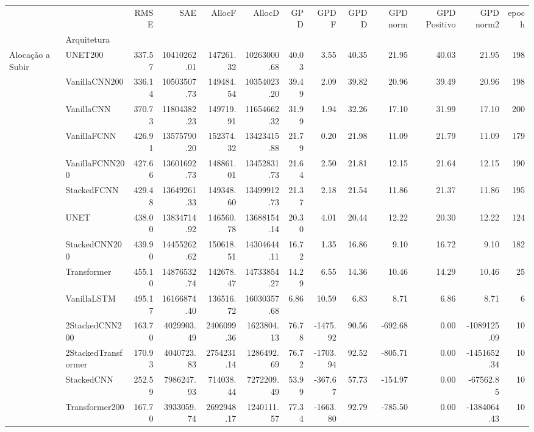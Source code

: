 \begin{tabular}{llrrrrrrrrrrr}
\toprule
 &  & RMSE & SAE & AllocF & AllocD & GPD & GPD F & GPD D & GPD norm & GPD Positivo & GPD norm2 & epoch \\
 & Arquitetura &  &  &  &  &  &  &  &  &  &  &  \\
\midrule
\multirow[t]{14}{*}{Alocação a Subir} & UNET200 & 337.57 & 10410262.01 & 147261.32 & 10263000.68 & 40.03 & 3.55 & 40.35 & 21.95 & 40.03 & 21.95 & 198 \\
 & VanillaCNN200 & 336.14 & 10503507.73 & 149484.54 & 10354023.20 & 39.49 & 2.09 & 39.82 & 20.96 & 39.49 & 20.96 & 198 \\
 & VanillaCNN & 370.73 & 11804382.23 & 149719.91 & 11654662.32 & 31.99 & 1.94 & 32.26 & 17.10 & 31.99 & 17.10 & 200 \\
 & VanillaFCNN & 426.91 & 13575790.20 & 152374.32 & 13423415.88 & 21.79 & 0.20 & 21.98 & 11.09 & 21.79 & 11.09 & 179 \\
 & VanillaFCNN200 & 427.66 & 13601692.73 & 148861.01 & 13452831.73 & 21.64 & 2.50 & 21.81 & 12.15 & 21.64 & 12.15 & 190 \\
 & StackedFCNN & 429.48 & 13649261.33 & 149348.60 & 13499912.73 & 21.37 & 2.18 & 21.54 & 11.86 & 21.37 & 11.86 & 195 \\
 & UNET & 438.00 & 13834714.92 & 146560.78 & 13688154.14 & 20.30 & 4.01 & 20.44 & 12.22 & 20.30 & 12.22 & 124 \\
 & StackedCNN200 & 439.90 & 14455262.62 & 150618.51 & 14304644.11 & 16.72 & 1.35 & 16.86 & 9.10 & 16.72 & 9.10 & 182 \\
 & Transformer & 455.10 & 14876532.74 & 142678.47 & 14733854.27 & 14.29 & 6.55 & 14.36 & 10.46 & 14.29 & 10.46 & 25 \\
 & VanillaLSTM & 495.17 & 16166874.40 & 136516.72 & 16030357.68 & 6.86 & 10.59 & 6.83 & 8.71 & 6.86 & 8.71 & 6 \\
 & 2StackedCNN200 & 163.70 & 4029903.49 & 2406099.36 & 1623804.13 & 76.78 & -1475.92 & 90.56 & -692.68 & 0.00 & -1089125.09 & 10 \\
 & 2StackedTransformer & 170.93 & 4040723.83 & 2754231.14 & 1286492.69 & 76.72 & -1703.94 & 92.52 & -805.71 & 0.00 & -1451652.34 & 10 \\
 & StackedCNN & 252.59 & 7986247.93 & 714038.44 & 7272209.49 & 53.99 & -367.67 & 57.73 & -154.97 & 0.00 & -67562.85 & 10 \\
 & Transformer200 & 167.70 & 3933059.74 & 2692948.17 & 1240111.57 & 77.34 & -1663.80 & 92.79 & -785.50 & 0.00 & -1384064.43 & 10 \\

\end{tabular}
